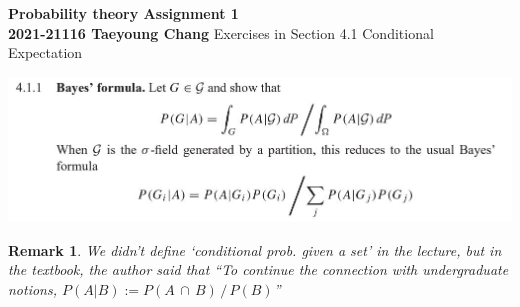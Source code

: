 \documentclass[12pt, A4]{article}
\newtheorem*{remark}{Remark}
\newcommand{\intersect}{\,\cap\,}
\begin{document}
\begin{titlepage}
	\begin{center}
		\vspace*{5cm}
		\textbf{\Large Probability theory \MakeUppercase{} Assignment 1}
		\\
		\vspace{1.5cm}
		\textbf{2021-21116 Taeyoung Chang}
		\vfill
		Exercises in Section 4.1 Conditional Expectation
		\\
	
		\vspace*{3cm}
		\thispagestyle{empty}
	\end{center}
\end{titlepage}
\includegraphics{Exer4.1.1.JPG}
\begin{remark}
    We didn't define `conditional prob. given a set' in the lecture, but in the textbook, the author said that ``To continue the connection with undergraduate notions, $P(A|B):=P(A\intersect B)\,/\,P(B)$''
\end{remark}
\end{document}
